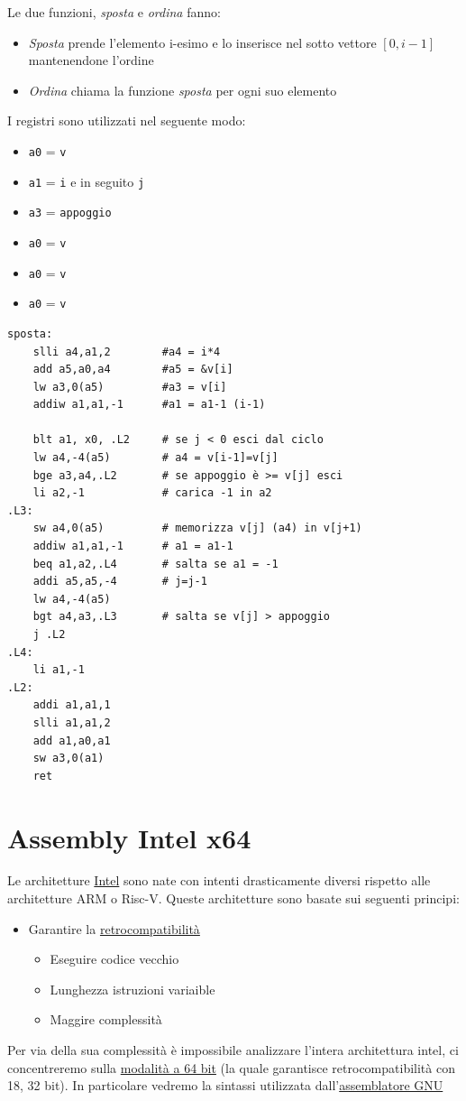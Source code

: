 Le due funzioni, \textit{sposta} e \textit{ordina} fanno:
\begin{itemize}
	\item \textit{Sposta} prende l'elemento i-esimo e lo inserisce nel sotto vettore $ \left[0,i-1\right] $ mantenendone l'ordine
	\item \textit{Ordina} chiama la funzione \textit{sposta} per ogni suo elemento
\end{itemize}
I registri sono utilizzati nel seguente modo:
\begin{itemize}
	\item \verb|a0| = \verb|v|
	\item \verb|a1| = \verb|i| e in seguito \verb|j|
	\item \verb|a3| = \verb|appoggio|
	\item \verb|a0| = \verb|v|
	\item \verb|a0| = \verb|v|
	\item \verb|a0| = \verb|v|
\end{itemize}
\begin{lstlisting}[language = assembly]
sposta:
    slli a4,a1,2        #a4 = i*4
    add a5,a0,a4        #a5 = &v[i]
    lw a3,0(a5)         #a3 = v[i]
    addiw a1,a1,-1      #a1 = a1-1 (i-1)

    blt a1, x0, .L2     # se j < 0 esci dal ciclo
    lw a4,-4(a5)        # a4 = v[i-1]=v[j]
    bge a3,a4,.L2       # se appoggio è >= v[j] esci
    li a2,-1            # carica -1 in a2
.L3:
    sw a4,0(a5)         # memorizza v[j] (a4) in v[j+1)
    addiw a1,a1,-1      # a1 = a1-1
    beq a1,a2,.L4       # salta se a1 = -1
    addi a5,a5,-4       # j=j-1
    lw a4,-4(a5)
    bgt a4,a3,.L3       # salta se v[j] > appoggio
    j .L2
.L4:
    li a1,-1
.L2:
    addi a1,a1,1
    slli a1,a1,2
    add a1,a0,a1
    sw a3,0(a1)
    ret
 \end{lstlisting}
\section{Assembly Intel x64}
Le architetture \underline{Intel} sono nate con intenti drasticamente diversi rispetto alle architetture ARM o Risc-V. Queste architetture sono basate sui seguenti principi:
\begin{itemize}
	\item Garantire la \underline{retrocompatibilità}
	      \begin{itemize}
		      \item Eseguire codice vecchio
		      \item Lunghezza istruzioni variaible
		      \item Maggire complessità
	      \end{itemize}
\end{itemize}
Per via della sua complessità è impossibile analizzare l'intera architettura intel, ci concentreremo sulla \underline{modalità a 64 bit} (la quale garantisce retrocompatibilità con 18, 32 bit). In particolare vedremo la sintassi utilizzata dall'\underline{assemblatore GNU}
